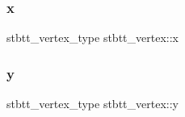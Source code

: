 \hypertarget{structstbtt__vertex_a81773edbe760d0e090561a3c1e86c919}{}\label{structstbtt__vertex_a81773edbe760d0e090561a3c1e86c919} 
\subsubsection{\texorpdfstring{x}{x}}
{\footnotesize\ttfamily stbtt\+\_\+vertex\+\_\+type stbtt\+\_\+vertex\+::x}

\hypertarget{structstbtt__vertex_a9052065ca544b63d537325b246928cfc}{}\label{structstbtt__vertex_a9052065ca544b63d537325b246928cfc} 
\subsubsection{\texorpdfstring{y}{y}}
{\footnotesize\ttfamily stbtt\+\_\+vertex\+\_\+type stbtt\+\_\+vertex\+::y}

